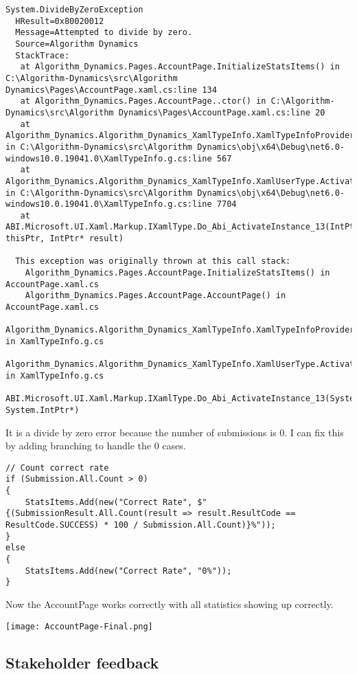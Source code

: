 \documentclass[report.tex]{subfiles}
\begin{document}
\begin{verbatim}
System.DivideByZeroException
  HResult=0x80020012
  Message=Attempted to divide by zero.
  Source=Algorithm Dynamics
  StackTrace:
   at Algorithm_Dynamics.Pages.AccountPage.InitializeStatsItems() in C:\Algorithm-Dynamics\src\Algorithm Dynamics\Pages\AccountPage.xaml.cs:line 134
   at Algorithm_Dynamics.Pages.AccountPage..ctor() in C:\Algorithm-Dynamics\src\Algorithm Dynamics\Pages\AccountPage.xaml.cs:line 20
   at Algorithm_Dynamics.Algorithm_Dynamics_XamlTypeInfo.XamlTypeInfoProvider.Activate_59_AccountPage() in C:\Algorithm-Dynamics\src\Algorithm Dynamics\obj\x64\Debug\net6.0-windows10.0.19041.0\XamlTypeInfo.g.cs:line 567
   at Algorithm_Dynamics.Algorithm_Dynamics_XamlTypeInfo.XamlUserType.ActivateInstance() in C:\Algorithm-Dynamics\src\Algorithm Dynamics\obj\x64\Debug\net6.0-windows10.0.19041.0\XamlTypeInfo.g.cs:line 7704
   at ABI.Microsoft.UI.Xaml.Markup.IXamlType.Do_Abi_ActivateInstance_13(IntPtr thisPtr, IntPtr* result)

  This exception was originally thrown at this call stack:
    Algorithm_Dynamics.Pages.AccountPage.InitializeStatsItems() in AccountPage.xaml.cs
    Algorithm_Dynamics.Pages.AccountPage.AccountPage() in AccountPage.xaml.cs
    Algorithm_Dynamics.Algorithm_Dynamics_XamlTypeInfo.XamlTypeInfoProvider.Activate_59_AccountPage() in XamlTypeInfo.g.cs
    Algorithm_Dynamics.Algorithm_Dynamics_XamlTypeInfo.XamlUserType.ActivateInstance() in XamlTypeInfo.g.cs
    ABI.Microsoft.UI.Xaml.Markup.IXamlType.Do_Abi_ActivateInstance_13(System.IntPtr, System.IntPtr*)
\end{verbatim}

It is a divide by zero error because the number of submissions is 0. I can fix this by adding branching to handle the 0 cases.

\begin{verbatim}
// Count correct rate
if (Submission.All.Count > 0)
{
    StatsItems.Add(new("Correct Rate", $"{(SubmissionResult.All.Count(result => result.ResultCode == ResultCode.SUCCESS) * 100 / Submission.All.Count)}%"));
}
else
{
    StatsItems.Add(new("Correct Rate", "0%"));
}
\end{verbatim}

Now the AccountPage works correctly with all statistics showing up correctly.

\texttt{[image: AccountPage-Final.png]}

\subsection{Stakeholder feedback}
\end{document}
